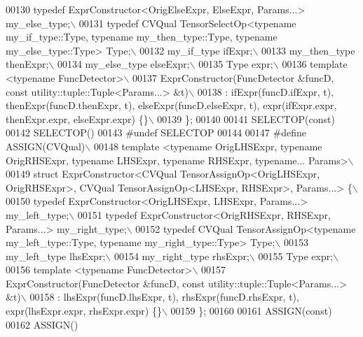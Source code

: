 \begin{DoxyCode}
00130 \textcolor{preprocessor}{  typedef  ExprConstructor<OrigElseExpr, ElseExpr, Params...> my\_else\_type;\(\backslash\)}
00131 \textcolor{preprocessor}{  typedef CVQual TensorSelectOp<typename my\_if\_type::Type, typename my\_then\_type::Type, typename
       my\_else\_type::Type> Type;\(\backslash\)}
00132 \textcolor{preprocessor}{  my\_if\_type ifExpr;\(\backslash\)}
00133 \textcolor{preprocessor}{  my\_then\_type thenExpr;\(\backslash\)}
00134 \textcolor{preprocessor}{  my\_else\_type elseExpr;\(\backslash\)}
00135 \textcolor{preprocessor}{  Type expr;\(\backslash\)}
00136 \textcolor{preprocessor}{  template <typename FuncDetector>\(\backslash\)}
00137 \textcolor{preprocessor}{  ExprConstructor(FuncDetector &funcD, const utility::tuple::Tuple<Params...> &t)\(\backslash\)}
00138 \textcolor{preprocessor}{  : ifExpr(funcD.ifExpr, t), thenExpr(funcD.thenExpr, t), elseExpr(funcD.elseExpr, t), expr(ifExpr.expr,
       thenExpr.expr, elseExpr.expr) \{\}\(\backslash\)}
00139 \textcolor{preprocessor}{\};}
00140 
00141 SELECTOP(\textcolor{keyword}{const})
00142 SELECTOP()
00143 \textcolor{preprocessor}{#undef SELECTOP}
00144 
00147 \textcolor{preprocessor}{#define ASSIGN(CVQual)\(\backslash\)}
00148 \textcolor{preprocessor}{template <typename OrigLHSExpr, typename OrigRHSExpr, typename LHSExpr, typename RHSExpr, typename...
       Params>\(\backslash\)}
00149 \textcolor{preprocessor}{struct ExprConstructor<CVQual TensorAssignOp<OrigLHSExpr, OrigRHSExpr>,  CVQual TensorAssignOp<LHSExpr,
       RHSExpr>, Params...> \{\(\backslash\)}
00150 \textcolor{preprocessor}{  typedef ExprConstructor<OrigLHSExpr, LHSExpr, Params...> my\_left\_type;\(\backslash\)}
00151 \textcolor{preprocessor}{  typedef ExprConstructor<OrigRHSExpr, RHSExpr, Params...> my\_right\_type;\(\backslash\)}
00152 \textcolor{preprocessor}{  typedef CVQual TensorAssignOp<typename my\_left\_type::Type, typename my\_right\_type::Type>  Type;\(\backslash\)}
00153 \textcolor{preprocessor}{  my\_left\_type lhsExpr;\(\backslash\)}
00154 \textcolor{preprocessor}{  my\_right\_type rhsExpr;\(\backslash\)}
00155 \textcolor{preprocessor}{  Type expr;\(\backslash\)}
00156 \textcolor{preprocessor}{  template <typename FuncDetector>\(\backslash\)}
00157 \textcolor{preprocessor}{  ExprConstructor(FuncDetector &funcD, const utility::tuple::Tuple<Params...> &t)\(\backslash\)}
00158 \textcolor{preprocessor}{  : lhsExpr(funcD.lhsExpr, t), rhsExpr(funcD.rhsExpr, t), expr(lhsExpr.expr, rhsExpr.expr) \{\}\(\backslash\)}
00159 \textcolor{preprocessor}{ \};}
00160 
00161  ASSIGN(\textcolor{keyword}{const})
00162  ASSIGN()

\end{DoxyCode}
